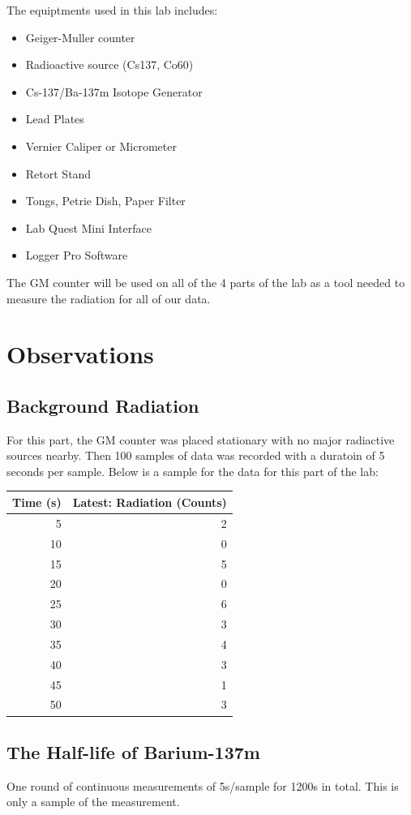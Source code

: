 \documentclass[12pt,letterpaper]{article}
\begin{document}
The equiptments used in this lab includes:

\begin{itemize}
    \item Geiger-Muller counter
    \item Radioactive source (Cs137, Co60)
    \item Cs-137/Ba-137m Isotope Generator
    \item Lead Plates
    \item Vernier Caliper or Micrometer
    \item Retort Stand
    \item Tongs, Petrie Dish, Paper Filter
    \item Lab Quest Mini Interface
    \item Logger Pro Software
\end{itemize}

The GM counter will be used on 
all of the 4 parts of the lab as a tool needed
to measure the radiation for all of our data.

\section{Observations}
\subsection{Background Radiation}
For this part, the GM counter was placed stationary 
with no major radiactive sources nearby. Then 100
samples of data was recorded with a duratoin of 5 seconds
per sample. Below is a sample for the data for this 
part of the lab:

\begin{tabular}{rr}
\toprule
Time (s) & Latest: Radiation (Counts) \\
\midrule
5 & 2 \\
10 & 0 \\
15 & 5 \\
20 & 0 \\
25 & 6 \\
30 & 3 \\
35 & 4 \\
40 & 3 \\
45 & 1 \\
50 & 3 \\
\bottomrule
\end{tabular}

\subsection{The Half-life of Barium-137m}
One round of continuous measurements of
5s/sample for 1200s in total. This is only a sample
of the measurement.
\end{document}
